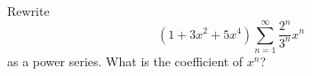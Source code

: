 Rewrite 
\[
(1 + 3x^2 + 5x^4) \sum_{n = 1}^\infty \frac{2^n}{3^n}x^n
\]
as a
power series.
What is the coefficient of $x^n$?

